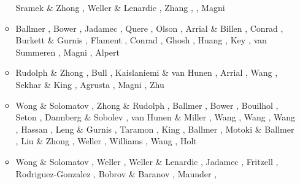 \begin{itemize}
\begin{scriptsize}
\begin{itemize}
                    Sramek \& Zhong \cite{srzh12}, Weller \& Lenardic \cite{wele12},
                    Zhang \etal \cite{zhzf12}, \cite{zams12},
                    Magni \etal \cite{mavf12}
\item[\twothousandthirteen] Ballmer \etal \cite{bacs13}, Bower \etal \cite{bogs13a,bogs13b},
                            Jadamec \etal \cite{jabr13}, Quere \etal \cite{qula13},
                            Olson \etal \cite{oldh13}, Arrial \& Billen \cite{arbi13},
                            Conrad \etal \cite{cost13}, Burkett \& Gurnis \cite{bugu13},
                            Flament \etal \cite{flgm13}, Conrad \cite{conr13},
                            Ghosh \etal \cite{ghbh13}, Huang \etal \cite{huyz13},
                            Key \etal \cite{kecl13}, van Summeren \etal \cite{vagc13},
                            Magni \etal \cite{mafv13}, Alpert \etal \cite{almb13}
\item[\twothousandfourteen] Rudolph \& Zhong \cite{ruzh14}, \cite{flgw14}
                            Bull \etal \cite{budt14}, Kaislaniemi \& van Hunen \cite{kava14},
                            Arrial \etal \cite{arfw14}, Wang \etal \cite{wavp14},
                            Sekhar \& King \cite{seki14}, Agrusta \etal \cite{agvg14},
                            Magni \etal \cite{mabv14}, Zhu \cite{zhu14}
\item[\twothousandfifteen] Wong \& Solomatov \cite{woso15}, Zhong \& Rudolph \cite{zhru15}, 
                    Ballmer \etal \cite{bacs15}, Bower \etal \cite{bogf15},
                    Bouilhol \etal \cite{bomv15}, Seton \etal \cite{sefw15},
                    Dannberg \& Sobolev \cite{daso15}, van Hunen \& Miller \cite{vami15},
                    Wang \etal \cite{wazh15}, Wang \etal \cite{wavp15},
                    Wang \etal \cite{waav15}, Hassan \etal \cite{hafg15},
                    Leng \& Gurnis \cite{legu15}, Taramon \etal \cite{tarn15}, 
                    King \cite{king15},
                    Ballmer \etal \cite{basn15}, Motoki \& Ballmer \cite{moba15},
                    Liu \& Zhong \cite{lizh15}, Weller \etal \cite{welo15},
                    Williams \etal \cite{wilm15}, Wang \etal \cite{wahz15},
                    Holt \etal \cite{hobb15}
\item[\twothousandsixteen] Wong \& Solomatov \cite{woso16a,woso16b}, Weller \etal \cite{welm16},
                    Weller \& Lenardic \cite{wele16}, Jadamec \cite{jada16,jada16b},
                    Fritzell \etal \cite{frbs16}, Rodriguez-Gonzalez \etal \cite{robn16},
                    Bobrov \& Baranov \cite{boba16}, Maunder \etal \cite{mavm16},

\end{itemize}
\end{scriptsize}
\end{itemize}
